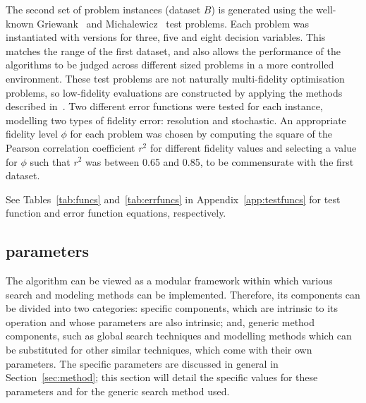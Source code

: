 The second set of problem instances (dataset $B$) is generated using the well-known Griewank~\cite{griewank1981generalized} and Michalewicz~\cite{michalewicz2013genetic} test problems. Each problem was instantiated with versions for three, five and eight decision variables. This matches the range of the first dataset, and also allows the performance of the algorithms to be judged across different sized problems in a more controlled environment. These test problems are not naturally multi-fidelity optimisation problems, so low-fidelity evaluations are constructed by applying the methods described in~\cite{wang2017generic}. Two different error functions were tested for each instance, modelling two types of fidelity error: resolution and stochastic. An appropriate fidelity level $\phi$ for each problem was chosen by computing the square of the Pearson correlation coefficient $r^2$ for different fidelity values and selecting a value for $\phi$ such that $r^2$ was between 0.65 and 0.85, to be commensurate with the first dataset.

See Tables~\ref{tab:funcs} and~\ref{tab:errfuncs} in Appendix~\ref{app:testfuncs} for test function and error function equations, respectively.


\subsection{\AlgName{} parameters}
The \AlgName{} algorithm can be viewed as a modular framework within which various search and modeling methods can be implemented. Therefore, its components can be divided into two categories: \AlgName{} specific components, which are intrinsic to its operation and whose parameters are also intrinsic; and, generic method components, such as global search techniques and modelling methods which can be substituted for other similar techniques, which come with their own parameters. The \AlgName{} specific parameters are discussed in general in Section~\ref{sec:method}; this section will detail the specific values for these  parameters and for the generic search method used.

